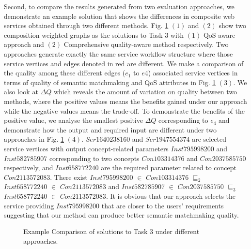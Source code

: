 \documentclass{llncs}
\begin{document}
Second, to compare the results generated from two evaluation approaches, we demonstrate an example solution that shows the differences in composite web services obtained through two different methods. Fig. \ref{comparisontest} $(1)$ and $(2)$ show two composition weighted graphs as the solutions to Task 3 with $(1)$ QoS-aware approach and $(2)$ Comprehensive quality-aware method respectively. Two approaches generate exactly the same service workflow structure where those service vertices and edges denoted in red are different. We make a comparison of the quality among these different edges ($e_1$ to $e4$) associated service vertices in terms of quality of semantic matchmaking and QoS attributes in Fig. \ref{comparisontest} $(3)$. We also look at $\Delta Q$ which reveals the amount of variation on quality between two methods, where the positive values means the benefits gained under our approach while the negative values means the trade-off. To demonstrate the benefits of the positive value, we analyse the smallest positive $\Delta Q$ corresponding to $e_4$ and demonstrate how the output and required input are different under two approaches in Fig. \ref{comparisontest} $(4)$. $Ser1640238160$ and $Ser1947554374$ are selected service vertices with output concept-related parameters $Inst795998200$ and $Inst582785907$ corresponding to two concepts $Con103314376$ and $Con2037585750$ respectively, and $Inst658772240$ are the required parameter related to concept $Con2113572083$. There exist $Inst795998200$ $\in$ $Con103314376$ $\sqsubseteq_{2}$ $Inst658772240$ $\in$ $Con2113572083$ and $Inst582785907$ $\in$ $Con2037585750$ $\sqsubseteq_{3}$ $Inst658772240$ $\in$ $Con2113572083$. It is obvious that our approach selects the service providing $Inst795998200$ that are closer to the users' requirements suggesting that our method can produce better semantic matchmaking quality.
\vspace{-0.5cm}
\begin{figure}[h]
 \caption{Example Comparison of solutions to Task 3 under different approaches.}
 \label{comparisontest}
\end{figure}
\vspace{-0.5cm}
\end{document}
